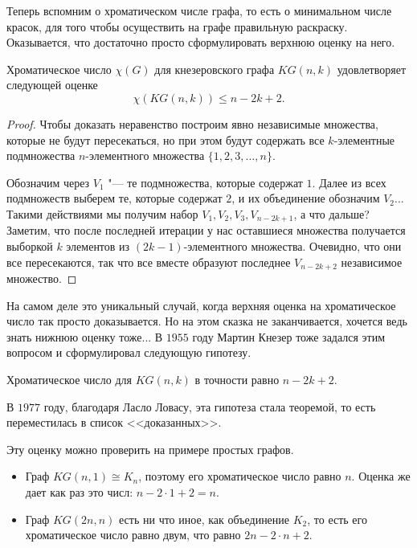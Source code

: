	Теперь вспомним о хроматическом числе графа, то есть о минимальном числе красок, для того чтобы осуществить на графе правильную раскраску. Оказывается, что достаточно просто сформулировать верхнюю оценку на него.
	
\begin{statement}
	Хроматическое число $\chi(G)$ для кнезеровского графа $KG(n, k)$ удовлетворяет следующей оценке 
	$$\chi (KG(n, k)) \leqslant n - 2k + 2.$$
	
	\begin{proof}
	Чтобы доказать неравенство построим явно независимые множества, которые не будут пересекаться, но при этом будут содержать все $k$-элементные подмножества $n$-элементного множества $\lbrace 1, 2, 3, \dots, n\rbrace$. 
	
	Обозначим через $V_1$ "--- те подмножества, которые содержат $1$. Далее из всех подмножеств выберем те, которые содержат $2$, и их объединение обозначим $V_2$... Такими действиями мы получим набор $V_1, V_2, V_3, V_{n - 2k + 1}$, а что дальше? Заметим, что после последней итерации у нас оставшиеся множества получается выборкой $k$ элементов из $(2k - 1)$-элементного множества. Очевидно, что они все пересекаются, так что все вместе образуют последнее $V_{n - 2k + 2}$ независимое множество.
	\end{proof}
\end{statement}

	На самом деле это уникальный случай, когда верхняя оценка на хроматическое число так просто доказывается. Но на этом сказка не заканчивается, хочется ведь знать нижнюю оценку тоже... В $1955$ году Мартин Кнезер тоже задался этим вопросом и сформулировал следующую гипотезу.
	
\begin{hypothesis}[Кнезера]
	Хроматическое число для $KG(n, k)$ в точности равно $n - 2k + 2$.
\end{hypothesis}

	В $1977$ году, благодаря Ласло Ловасу, эта гипотеза стала теоремой, то есть переместилась в список <<доказанных>>.

	Эту оценку можно проверить на примере простых графов.
	
\begin{itemize}
	\item Граф $KG(n, 1) \cong K_n$, поэтому его хроматическое число равно $n$. Оценка же дает как раз это числ: $n - 2 \cdot 1 + 2 = n$. 
	\item Граф $KG(2n, n)$ есть ни что иное, как объединение $K_2$, то есть его хроматическое число равно двум, что равно $2n - 2 \cdot n + 2$.
\end{itemize}
	
